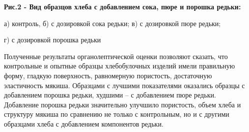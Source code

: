 



{\bfseries Рис.2 - Вид образцов хлеба с добавлением сока, пюре и порошка редьки:}

а) контроль, б) с дозировкой сока редьки; в) с дозировкой пюре редьки;

г) с дозировкой порошка редьки

\begin{multicols}{2}
Полученные результаты органолептической оценки позволяют сказать, что
контрольные и опытные образцы хлебобулочных изделий имели правильную
форму, гладкую поверхность, равномерную пористость, достаточную
эластичность мякиша. Образцами с лучшими показателями оказались образцы
с добавлением порошка редьки, худшими -- с добавлением пюре редьки.
Добавление порошка редьки значительно улучшило пористость, объем хлеба и
структуру мякиша по сравнению не только с контрольным, но и с другими
образцами хлеба с добавлением компонентов редьки.
\end{multicols}

